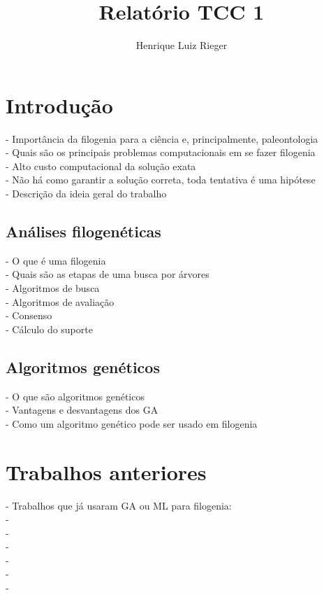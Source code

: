 \documentclass[12pt]{article}
\title{Relatório TCC 1}
\author{Henrique Luiz Rieger\inst{1}}
\begin{document}
 

\maketitle

\begin{resumo} 
\end{resumo}

\begin{abstract}
\end{abstract}

\section{Introdução}
- Importância da filogenia para a ciência e, principalmente, paleontologia \\
- Quais são os principais problemas computacionais em se fazer filogenia \\
  - Alto custo computacional da solução exata \\
  - Não há como garantir a solução correta, toda tentativa é uma hipótese \\
- Descrição da ideia geral do trabalho
\subsection{Análises filogenéticas}
- O que é uma filogenia \\
- Quais são as etapas de uma busca por árvores \\
  - Algoritmos de busca \\
  - Algoritmos de avaliação \\
  - Consenso \\
  - Cálculo do suporte \\
\subsection{Algoritmos genéticos}
- O que são algoritmos genéticos \\
- Vantagens e desvantagens dos GA \\
- Como um algoritmo genético pode ser usado em filogenia \\

\section{Trabalhos anteriores}
- Trabalhos que já usaram GA ou ML para filogenia: \\
  - \cite{cotta2002inferring} \\
  - \cite{mo-phylogenetics} \\
  - \cite{mo-phynet} \\
  - \cite{azouri2021harnessing} \\
  - \cite{parallel-gaml} \\
  - \cite{garli} \\
\end{document}
